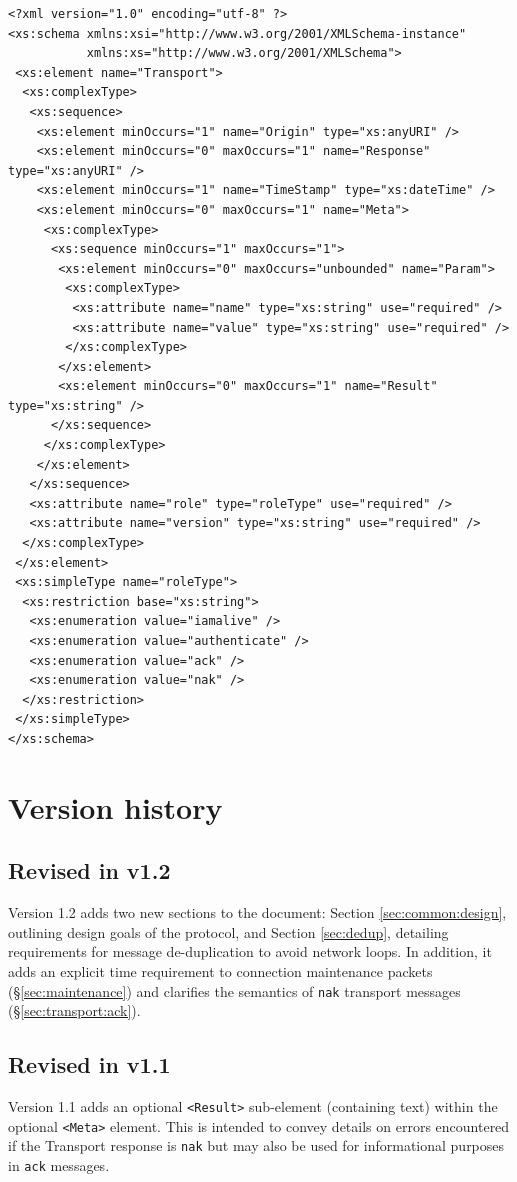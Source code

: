 \documentclass[a4paper,11pt]{ivoa}
\begin{document}
\begin{verbatim}
<?xml version="1.0" encoding="utf-8" ?>
<xs:schema xmlns:xsi="http://www.w3.org/2001/XMLSchema-instance"
           xmlns:xs="http://www.w3.org/2001/XMLSchema">
 <xs:element name="Transport">
  <xs:complexType>
   <xs:sequence>
    <xs:element minOccurs="1" name="Origin" type="xs:anyURI" />
    <xs:element minOccurs="0" maxOccurs="1" name="Response" type="xs:anyURI" />
    <xs:element minOccurs="1" name="TimeStamp" type="xs:dateTime" />
    <xs:element minOccurs="0" maxOccurs="1" name="Meta">
     <xs:complexType>
      <xs:sequence minOccurs="1" maxOccurs="1">
       <xs:element minOccurs="0" maxOccurs="unbounded" name="Param">
        <xs:complexType>
         <xs:attribute name="name" type="xs:string" use="required" />
         <xs:attribute name="value" type="xs:string" use="required" />
        </xs:complexType>
       </xs:element>
       <xs:element minOccurs="0" maxOccurs="1" name="Result" type="xs:string" />
      </xs:sequence>
     </xs:complexType>
    </xs:element>
   </xs:sequence>
   <xs:attribute name="role" type="roleType" use="required" />
   <xs:attribute name="version" type="xs:string" use="required" />
  </xs:complexType>
 </xs:element>
 <xs:simpleType name="roleType">
  <xs:restriction base="xs:string">
   <xs:enumeration value="iamalive" />
   <xs:enumeration value="authenticate" />
   <xs:enumeration value="ack" />
   <xs:enumeration value="nak" />
  </xs:restriction>
 </xs:simpleType>
</xs:schema>
\end{verbatim}

\section{Version history}

\subsection{Revised in v1.2}

Version 1.2 adds two new sections to the document: Section
\ref{sec:common:design}, outlining design goals of the protocol, and Section
\ref{sec:dedup}, detailing requirements for message de-duplication to avoid
network loops. In addition, it adds an explicit time requirement to connection
maintenance packets (\S\ref{sec:maintenance}) and clarifies the semantics of
\texttt{nak} transport messages (\S\ref{sec:transport:ack}).

\subsection{Revised in v1.1}

Version 1.1 adds an optional \texttt{<Result>} sub-element (containing text)
within the optional \texttt{<Meta>} element. This is intended to convey
details on errors encountered if the Transport response is \texttt{nak} but
may also be used for informational purposes in \texttt{ack} messages.



\end{document}
